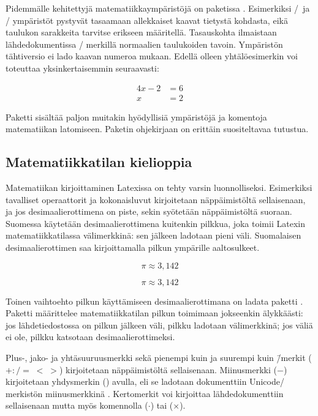 \noindent
Pidemmälle kehitettyjä matematiikkaympäristöjä on paketissa
. Esimerkiksi \-/\ ja
\-/ ympäristöt pystyvät tasaamaan allekkaiset kaavat
tietystä kohdasta, eikä taulukon sarakkeita tarvitse erikseen
määritellä. Tasauskohta ilmaistaan lähdedokumentissa \koodi{\&}\-/
merkillä normaalien taulukoiden tavoin. Ympäristön tähtiversio
 ei lado kaavan numeroa mukaan. Edellä olleen
yhtälöesimerkin voi toteuttaa yksinkertaisemmin seuraavasti:

\begin{koodilohkosis}
\begin{align*}
  4x - 2 &= 6 \\
  x      &= 2
\end{align*}
\end{koodilohkosis}

\noindent
Paketti  sisältää paljon muitakin hyödyllisiä
ympäristöjä ja komentoja matematiikan latomiseen. Paketin ohjekirjaan on
erittäin suositeltavaa tutustua.

\subsection{Matematiikkatilan kielioppia}

Matematiikan kirjoittaminen Latexissa on tehty varsin luonnolliseksi.
Esimerkiksi tavalliset operaattorit ja kokonaisluvut kirjoitetaan
näppäimistöltä sellaisenaan, ja jos desimaalierottimena on piste, sekin
syötetään näppäimistöltä suoraan. Suomessa käytetään desimaalierottimena
kuitenkin pilkkua, joka toimii Latexin matematiikkatilassa välimerkkinä:
sen jälkeen ladotaan pieni väli. Suomalaisen desimaalierottimen saa
kirjoittamalla pilkun ympärille aaltosulkeet.

\begin{koodilohkosis}
\[ \pi \approx 3{,}142 \]
\end{koodilohkosis}
\[ \pi \approx 3{,}142 \]

\noindent
Toinen vaihtoehto pilkun käyttämiseen desimaalierottimana on ladata
paketti . Paketti määrittelee matematiikkatilan
pilkun toimimaan jokseenkin älykkäästi: jos lähdetiedostossa on pilkun
jälkeen väli, pilkku ladotaan välimerkkinä; jos väliä ei ole, pilkku
katsotaan desimaalierottimeksi.

Plus-, jako- ja yhtäsuuruusmerkki sekä pienempi kuin ja suurempi kuin
\=/merkit ($+ : / = \; < \; >$) kirjoitetaan näppäimistöltä
sellaisenaan. Miinusmerkki ($-$) kirjoitetaan yhdysmerkin (\koodi{-})
avulla, eli se ladotaan dokumenttiin Unicode\-/ merkistön miinusmerkkinä
. Kertomerkit voi kirjoittaa
lähdedokumenttiin sellaisenaan mutta myös komennolla 
($\cdot$) tai  ($\times$).

